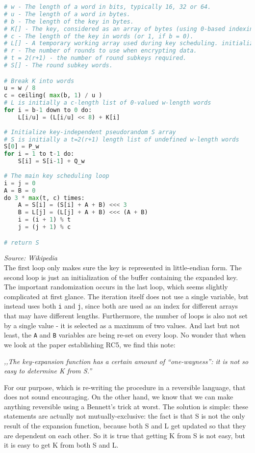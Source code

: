 \documentclass[a4paper,10pt,openright]{memoir}
\newcommand{\code}[1]{\texttt{#1}}
\begin{document}
\begin{lstlisting}[language=Python]
# w - The length of a word in bits, typically 16, 32 or 64.
# u - The length of a word in bytes.
# b - The length of the key in bytes.
# K[] - The key, considered as an array of bytes (using 0-based indexing).
# c - The length of the key in words (or 1, if b = 0).
# L[] - A temporary working array used during key scheduling. initialized to the key in words.
# r - The number of rounds to use when encrypting data.
# t = 2(r+1) - the number of round subkeys required.
# S[] - The round subkey words.

# Break K into words
u = w / 8
c = ceiling( max(b, 1) / u )
# L is initially a c-length list of 0-valued w-length words
for i = b-1 down to 0 do:
    L[i/u] = (L[i/u] << 8) + K[i]
     
# Initialize key-independent pseudorandom S array
# S is initially a t=2(r+1) length list of undefined w-length words
S[0] = P_w
for i = 1 to t-1 do:
    S[i] = S[i-1] + Q_w
    
# The main key scheduling loop
i = j = 0
A = B = 0
do 3 * max(t, c) times:
    A = S[i] = (S[i] + A + B) <<< 3
    B = L[j] = (L[j] + A + B) <<< (A + B)
    i = (i + 1) % t
    j = (j + 1) % c

# return S
\end{lstlisting}
\textit{\footnotesize Source: Wikipedia}\\

The first loop only makes sure the key is represented in little-endian 
form. The second loop is just an initialization of the buffer 
containing the expanded key. The important randomization occurs in the 
last loop, which seems slightly complicated at first glance. The 
iteration itself does not use a single variable, but instead uses both 
\code{i} and \code{j}, since both are used as an index for different 
arrays that may have different lengths. Furthermore, the number of 
loops is also not set by a single value - it is selected as a maximum 
of two values. And last but not least, the \code{A} and \code{B} 
variables are being re-set on every loop. No wonder that when we look 
at the paper establishing RC5, we find this note: 

\textit{,,The key-expansion function has a certain amount of 
``one-wayness'': it is not so easy to determine K from S.''}

For our purpose, which is re-writing the procedure in a reversible 
language, that does not sound encouraging. On the other hand, we know that 
we can make anything reversible using a Bennett's trick at worst. The 
solution is simple: these statements are actually not 
mutually-exclusive: the fact is that S is not the only result of the 
expansion function, because both S and L get updated so that they are 
dependent on each other. So it is true that getting K from S is not 
easy, but it is easy to get K from both S and L.
\end{document}
